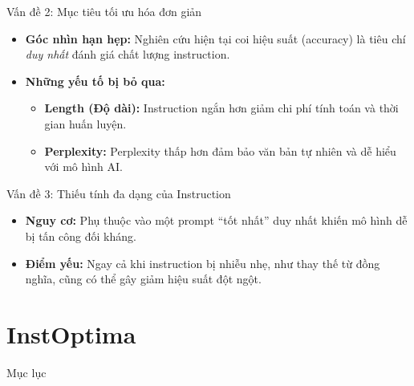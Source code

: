 \documentclass[12pt,xcolor=table]{beamer}
\begin{document}
\begin{frame}{Vấn đề 2: Mục tiêu tối ưu hóa đơn giản}
    \begin{itemize}
        \item \textbf{Góc nhìn hạn hẹp:} Nghiên cứu hiện tại coi hiệu suất (accuracy) là tiêu chí \textit{duy nhất} đánh giá chất lượng instruction.
        \item \textbf{Những yếu tố bị bỏ qua:}
        \begin{itemize}
            \item \textbf{Length (Độ dài):} Instruction ngắn hơn giảm chi phí tính toán và thời gian huấn luyện.
            \item \textbf{Perplexity:} Perplexity thấp hơn đảm bảo văn bản tự nhiên và dễ hiểu với mô hình AI.
        \end{itemize}

    \end{itemize}
\end{frame}

\begin{frame}{Vấn đề 3: Thiếu tính đa dạng của Instruction}
    \begin{itemize}
        \item \textbf{Nguy cơ:} Phụ thuộc vào một prompt ``tốt nhất'' duy nhất khiến mô hình dễ bị tấn công đối kháng.
        \item \textbf{Điểm yếu:} Ngay cả khi instruction bị nhiễu nhẹ, như thay thế từ đồng nghĩa, cũng có thể gây giảm hiệu suất đột ngột.
    \end{itemize}
\end{frame}

\section{InstOptima}
\begin{frame}{Mục lục}
    \tableofcontents[currentsection]
\end{frame}
\end{document}
